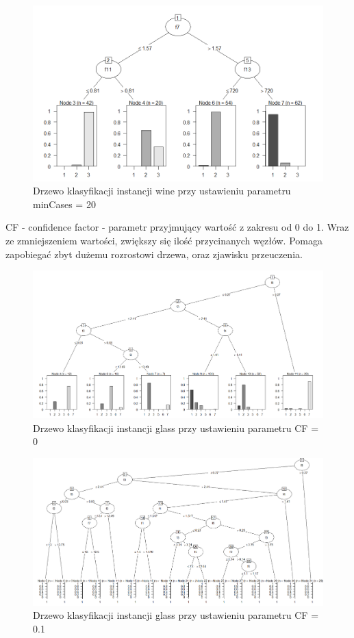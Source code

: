 \documentclass[12pt,a4paper]{article}
\begin{document}
\begin{figure}[H]
\centering
\includegraphics[width=1\textwidth]{wineMinCase20.png}
\caption{Drzewo klasyfikacji instancji wine przy ustawieniu parametru minCases = 20}
\end{figure}

CF - confidence factor - parametr przyjmujący wartość z zakresu od 0 do 1. Wraz ze zmniejszeniem wartości, zwiększy się ilość przycinanych węzłów. Pomaga zapobiegać zbyt dużemu rozrostowi drzewa, oraz zjawisku przeuczenia.

\begin{figure}[H]
\centering
\includegraphics[width=1\textwidth]{glassCF_0.png}
\caption{Drzewo klasyfikacji instancji glass przy ustawieniu parametru CF = 0}
\end{figure}

\begin{figure}[H]
\centering
\includegraphics[width=1\textwidth]{glassCF_0_1.png}
\caption{Drzewo klasyfikacji instancji glass przy ustawieniu parametru CF = 0.1}
\end{figure}
\end{document}
